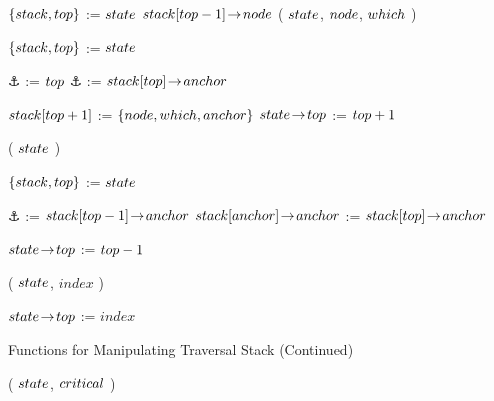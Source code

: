 \begin{limitscope}
\begin{algorithm}[tb]
{   $\{  stack, top  \}$ := $state$\;
	 \Return $stack[top-1] \!\rightarrow\! node$\;
	 \label{lin:local-get|second|to|top:end}
}
\BlankLine
\DontPrintSemicolon
\AddToTop(  $state$, $node$, $\which$ )\;
\PrintSemicolon
\label{lin:local-add|to|top:begin}
\Begin
{
   
   $\{  stack, top  \}$ := $state$\;
   	
   \lIf{$\which$ = \RIGHT}
	 {
	    $\anchor$ := $top$
	 }
	 \lElse
	 {
	    $\anchor$ := $\stack[\sTop] \rarrow \anchor$
	 }
   
   $stack[top + 1]$ := $\{  node, which, anchor  \}$\;
	 $state \!\rightarrow\! top$ := $top + 1$\;
	 \OptReturn
	 \label{lin:local-add|to|top:end}
	
}
\BlankLine
\DontPrintSemicolon
\RemoveFromTop ( $state$ )\;
\PrintSemicolon
\label{lin:local-remove|from|top:begin}
\Begin
{
   
   $\{  stack, top  \}$ := $state$\;
	
	 $\anchor$ := $stack[top - 1] \!\rightarrow\! anchor$\;
	 \If{$\stack[\sTop] \rarrow \anchor$ $<$ $\stack[\anchor] \rarrow \anchor$}
	 {
	    $\stack[\anchor] \rarrow \anchor$ := $\stack[\sTop] \rarrow \anchor$\;  
	 }
	
	 $state \!\rightarrow\! top$ := $top - 1$\;
	 \OptReturn
	 \label{lin:local-remove|from|top:end}
	 	 
}
\BlankLine
\DontPrintSemicolon
\RemoveUntilCritical( $state$,  $index$ )\;
\PrintSemicolon
\label{lin:local-remove|until|critical:begin}
\Begin
{
  
   $state \!\rightarrow\! top$ := $index$\;
	 \OptReturn
	 \label{lin:local-remove|until|critical:end}

}
\end{algorithm}

\begin{algorithm}
\caption{Functions for Manipulating Traversal Stack (Continued)} 
\label{algo:local-local-stack|functions|2}
\DefineKeyWords
{}
\DontPrintSemicolon
\RememberCritical( $state$,  $critical$ )\;
\PrintSemicolon
\label{lin:local-remember|critical:begin}
\Begin
{
  
}
\end{algorithm}
\end{limitscope}
